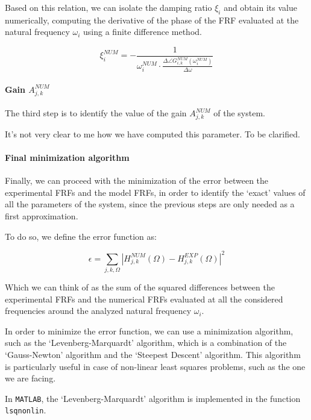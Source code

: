 Based on this relation, we can isolate the damping ratio $\xi_i$ and obtain its value numerically, computing the derivative of the phase of the FRF evaluated at the natural frequency $\omega_i$ using a finite difference method.

\begin{equation}
    \xi_i^{NUM} = - \frac{1}{\omega_i^{NUM} \cdot \frac{\Delta \angle G_{i,k}^{NUM}(\omega_i^{NUM})}{\Delta \omega}}
\end{equation}

\paragraph{Gain $A_{j, k}^{NUM}$}

The third step is to identify the value of the gain $A_{j, k}^{NUM}$ of the system.

\begin{center}
    \huge{It's not very clear to me how we have computed this parameter. To be clarified.}
\end{center}

\paragraph{Final minimization algorithm}

Finally, we can proceed with the minimization of the error between the experimental FRFs and the model FRFs, in order to identify the `exact' values of all the parameters of the system, since the previous steps are only needed as a first approximation.

To do so, we define the error function as:

\begin{equation}
    \epsilon = \sum_{j, k, \Omega} \left| H_{j, k}^{NUM}(\Omega) - H_{j, k}^{EXP}(\Omega) \right|^2
    \label{eq:error_function}
\end{equation}

Which we can think of as the sum of the squared differences between the experimental FRFs and the numerical FRFs evaluated at all the considered frequencies around the analyzed natural frequency $\omega_i$.

In order to minimize the error function, we can use a minimization algorithm, such as the `Levenberg-Marquardt' algorithm, which is a combination of the `Gauss-Newton' algorithm and the `Steepest Descent' algorithm.
This algorithm is particularly useful in case of non-linear least squares problems, such as the one we are facing.

In \texttt{MATLAB}, the `Levenberg-Marquardt' algorithm is implemented in the function \texttt{lsqnonlin}.
